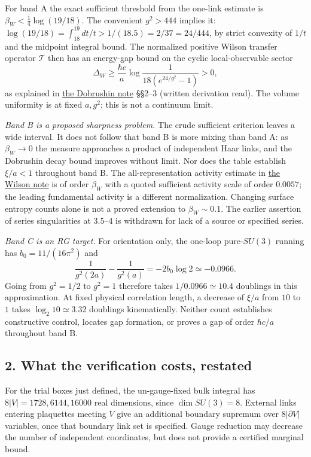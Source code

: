 \documentclass[11pt,a4paper]{article}
\begin{document}
For band A the exact sufficient threshold from the one-link estimate is
\(\beta_W<\tfrac14\log(19/18)\). The convenient \(g^2>444\) implies it:
\(\log(19/18)=\int_{18}^{19}dt/t>1/(18.5)=2/37=24/444\), by strict
convexity of \(1/t\) and the midpoint integral bound. The normalized
positive Wilson transfer operator \(\mathcal T\) then has an energy-gap
bound on the cyclic local-observable sector
\[\Delta_W\ge\frac{\hbar c}{a}
\log\frac{1}{18(e^{24/g^2}-1)}>0,\] as explained in
\href{dobrushin-uniqueness-wilson.md}{the Dobrushin note} §§2--3
(written derivation read). The volume uniformity is at fixed \(a,g^2\);
this is not a continuum limit.

\emph{Band B is a proposed sharpness problem.} The crude sufficient
criterion leaves a wide interval. It does not follow that band B is more
mixing than band A: as \(\beta_W\to0\) the measure approaches a product
of independent Haar links, and the Dobrushin decay bound improves
without limit. Nor does the table establish \(\xi/a<1\) throughout band
B. The all-representation activity estimate in
\href{wilson-strong-coupling-explicit.md}{the Wilson note} is of order
\(\beta_W\) with a quoted sufficient activity scale of order \(0.0057\);
the leading fundamental activity is a different normalization. Changing
surface entropy counts alone is not a proved extension to
\(\beta_W\sim0.1\). The earlier assertion of series singularities at
\(3.5\)--\(4\) is withdrawn for lack of a source or specified series.

\emph{Band C is an RG target.} For orientation only, the one-loop
pure-\(SU(3)\) running has \(b_0=11/(16\pi^2)\) and
\[\frac{1}{g^2(2a)}-\frac{1}{g^2(a)}=-2b_0\log2
\simeq-0.0966.\] Going from \(g^2=1/2\) to \(g^2=1\) therefore takes
\(1/0.0966\simeq10.4\) doublings in this approximation. At fixed
physical correlation length, a decrease of \(\xi/a\) from \(10\) to
\(1\) takes \(\log_2 10\simeq3.32\) doublings kinematically. Neither
count establishes constructive control, locates gap formation, or proves
a gap of order \(\hbar c/a\) throughout band B.

\hypertarget{what-the-verification-costs-restated}{%
\subsection{2. What the verification costs,
restated}\label{what-the-verification-costs-restated}}

For the trial boxes just defined, the un-gauge-fixed bulk integral has
\(8|V|=1728,6144,16000\) real dimensions, since \(\dim SU(3)=8\).
External links entering plaquettes meeting \(V\) give an additional
boundary supremum over \(8|\partial V|\) variables, once that boundary
link set is specified. Gauge reduction may decrease the number of
independent coordinates, but does not provide a certified marginal
bound.
\end{document}
